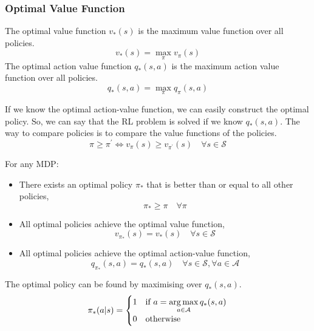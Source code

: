 \subsubsection{Optimal Value Function}
\begin{definition}
    The optimal value function \(v_{*} (s)\) is the maximum value function over all policies.
    \[
        v_{*} (s) = \max_{\pi} v_{\pi} (s)  
    \]
    The optimal action value function \(q_{*} (s, a)\) is the maximum
    action value function over all policies.
    \[
        q_{*} (s, a) = \max_{\pi} q_{\pi} (s, a)
    \]
\end{definition}
If we know the optimal action-value function, we can easily construct the optimal policy. 
So, we can say that the RL problem is solved if we know \(q_{*} (s, a)\). The way to compare
policies is to compare the value functions of the policies.
\[
    \pi \geq \pi^{\prime} \iff v_{\pi} (s) \geq v_{\pi^{\prime}} (s) \quad \forall s \in \mathcal{S}  
\]
\begin{theorem}
    For any MDP:
    \begin{itemize}
        \item There exists an optimal policy \(\pi_{*} \) that is better than or equal to all other policies,
        \[
            \pi_{*} \geq \pi \quad \forall \pi  
        \]
        \item All optimal policies achieve the optimal value function,
        \[
            v_{\pi_{*}} (s) = v_{*} (s) \quad \forall s \in \mathcal{S}  
        \]
        \item All optimal policies achieve the optimal action-value function,
        \[
            q_{\pi_{*}} (s, a) = q_{*} (s, a) \quad \forall s \in \mathcal{S} , \forall a \in \mathcal{A}  
        \]
    \end{itemize}
\end{theorem}
The optimal policy can be found by maximising over \(q_{*} (s, a)\).
\[
    \pi_{*} (a|s) = 
    \begin{cases}
        1 & \text{if } a = \operatorname*{arg\,max}\limits_{a \in \mathcal{A} } q_{*} (s, a) \\
        0 & \text{otherwise} \\
    \end{cases}
\]
